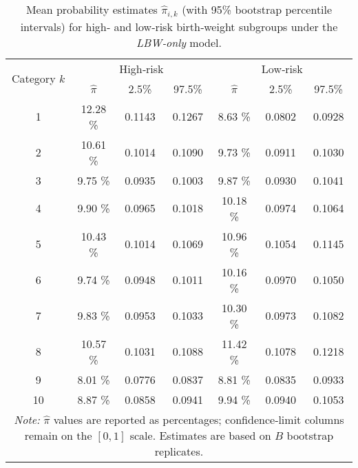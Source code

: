 \begin{table}[htbp]
\centering
\caption{Mean probability estimates $\hat{\pi}_{i,k}$ (with 95\% bootstrap percentile intervals) for high‑ and low‑risk birth‑weight subgroups under the \emph{LBW‑only} model.}
\label{tab:pi_mean_lbw}
\begin{tabular}{ccccccc}
\toprule
\multirow{2}{*}{Category $k$} & \multicolumn{3}{c}{High‑risk} & \multicolumn{3}{c}{Low‑risk} \\
\cmidrule(lr){2-4}\cmidrule(lr){5-7}
 & $\hat{\pi}$ & 2.5\% & 97.5\% & $\hat{\pi}$ & 2.5\% & 97.5\% \\
\midrule
1  & 12.28 \% & 0.1143 & 0.1267 & 8.63 \% & 0.0802 & 0.0928 \\
2  & 10.61 \% & 0.1014 & 0.1090 & 9.73 \% & 0.0911 & 0.1030 \\
3  & 9.75 \% & 0.0935 & 0.1003 & 9.87 \% & 0.0930 & 0.1041 \\
4  & 9.90 \% & 0.0965 & 0.1018 & 10.18 \% & 0.0974 & 0.1064 \\
5  & 10.43 \% & 0.1014 & 0.1069 & 10.96 \% & 0.1054 & 0.1145 \\
6  & 9.74 \% & 0.0948 & 0.1011 & 10.16 \% & 0.0970 & 0.1050 \\
7  & 9.83 \% & 0.0953 & 0.1033 & 10.30 \% & 0.0973 & 0.1082 \\
8  & 10.57 \% & 0.1031 & 0.1088 & 11.42 \% & 0.1078 & 0.1218 \\
9  & 8.01 \% & 0.0776 & 0.0837 & 8.81 \% & 0.0835 & 0.0933 \\
10 & 8.87 \% & 0.0858 & 0.0941 & 9.94 \% & 0.0940 & 0.1053 \\
\bottomrule
\multicolumn{7}{p{0.9\textwidth}}{\textit{Note:} $\hat{\pi}$ values are reported as percentages; confidence‑limit columns remain on the \([0,1]\) scale.  Estimates are based on $B$ bootstrap replicates.}\\
\end{tabular}
\end{table}